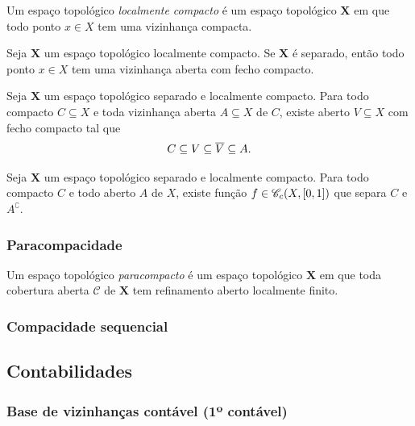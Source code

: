 \begin{definition}
Um espaço topológico \emph{localmente compacto} é um espaço topológico $\bm X$ em que todo ponto $x \in X$ tem uma vizinhança compacta.
\end{definition}

\begin{proposition}
Seja $\bm X$ um espaço topológico localmente compacto. Se $\bm X$ é separado, então todo ponto $x \in X$ tem uma vizinhança aberta com fecho compacto.
\end{proposition}

\begin{proposition}
Seja $\bm X$ um espaço topológico separado e localmente compacto. Para todo compacto $C \subseteq X$ e toda vizinhança aberta $A \subseteq X$ de $C$, existe aberto $V \subseteq X$ com fecho compacto tal que
	\begin{equation*}
	C \subseteq V \subseteq \overline{V} \subseteq A.
	\end{equation*}
\end{proposition}

\begin{proposition}
Seja $\bm X$ um espaço topológico separado e localmente compacto. Para todo compacto $C$ e todo aberto $A$ de $X$, existe função $f \in \mathscr{C}_c(X,\left[{0},{1}\right])$ que separa $C$ e $A^\complement$.
\end{proposition}


\subsubsection{Paracompacidade}

\begin{definition}
Um espaço topológico \emph{paracompacto} é um espaço topológico $\bm X$ em que toda cobertura aberta $\mathcal C$ de $\bm X$ tem refinamento aberto localmente finito.
\end{definition}

\subsubsection{Compacidade sequencial}



\subsection{Contabilidades}

\subsubsection{Base de vizinhanças contável (1º contável)}

